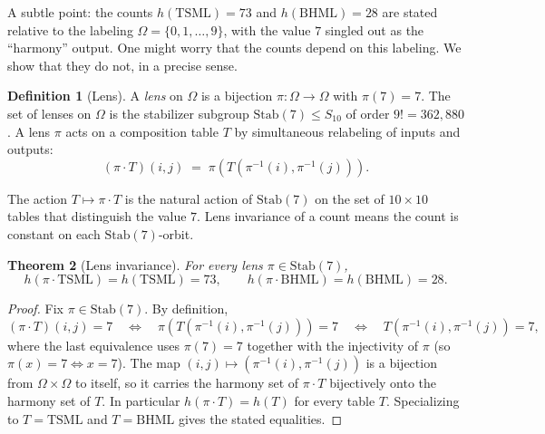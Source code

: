 \documentclass[11pt,reqno]{amsart}
\theoremstyle{plain}
\newtheorem{theorem}{Theorem}
\theoremstyle{definition}
\newtheorem{definition}[theorem]{Definition}
\theoremstyle{remark}
\newcommand{\TSML}{\mathrm{TSML}}
\newcommand{\BHML}{\mathrm{BHML}}
\begin{document}
A subtle point: the counts $h(\TSML) = 73$ and $h(\BHML) = 28$
are stated relative to the labeling
$\Omega = \{0, 1, \ldots, 9\}$, with the value $7$ singled out as
the ``harmony'' output. One might worry that the counts depend on
this labeling. We show that they do not, in a precise sense.

\begin{definition}[Lens]\label{def:lens}
A \emph{lens} on $\Omega$ is a bijection
$\pi : \Omega \to \Omega$ with $\pi(7) = 7$. The set of lenses on
$\Omega$ is the stabilizer subgroup $\mathrm{Stab}(7) \le S_{10}$
of order $9! = 362{,}880$. A lens $\pi$ acts on a composition
table $T$ by simultaneous relabeling of inputs and outputs:
\[
  (\pi \cdot T)(i, j) \;=\; \pi(T(\pi^{-1}(i), \pi^{-1}(j))).
\]
\end{definition}

The action $T \mapsto \pi \cdot T$ is the natural action of
$\mathrm{Stab}(7)$ on the set of $10 \times 10$ tables that
distinguish the value $7$. Lens invariance of a count means the
count is constant on each $\mathrm{Stab}(7)$-orbit.

\begin{theorem}[Lens invariance]\label{thm:lens}
For every lens $\pi \in \mathrm{Stab}(7)$,
\[
  h(\pi \cdot \TSML) = h(\TSML) = 73,
  \qquad
  h(\pi \cdot \BHML) = h(\BHML) = 28.
\]
\end{theorem}

\begin{proof}
Fix $\pi \in \mathrm{Stab}(7)$. By definition,
\[
  (\pi \cdot T)(i, j) = 7
  \quad \iff \quad
  \pi(T(\pi^{-1}(i), \pi^{-1}(j))) = 7
  \quad \iff \quad
  T(\pi^{-1}(i), \pi^{-1}(j)) = 7,
\]
where the last equivalence uses $\pi(7) = 7$ together with the
injectivity of $\pi$ (so $\pi(x) = 7 \iff x = 7$).
The map $(i, j) \mapsto (\pi^{-1}(i), \pi^{-1}(j))$ is a bijection
from $\Omega \times \Omega$ to itself, so it carries the harmony
set of $\pi \cdot T$ bijectively onto the harmony set of $T$. In
particular $h(\pi \cdot T) = h(T)$ for every table $T$. Specializing
to $T = \TSML$ and $T = \BHML$ gives the stated equalities.
\end{proof}
\end{document}
